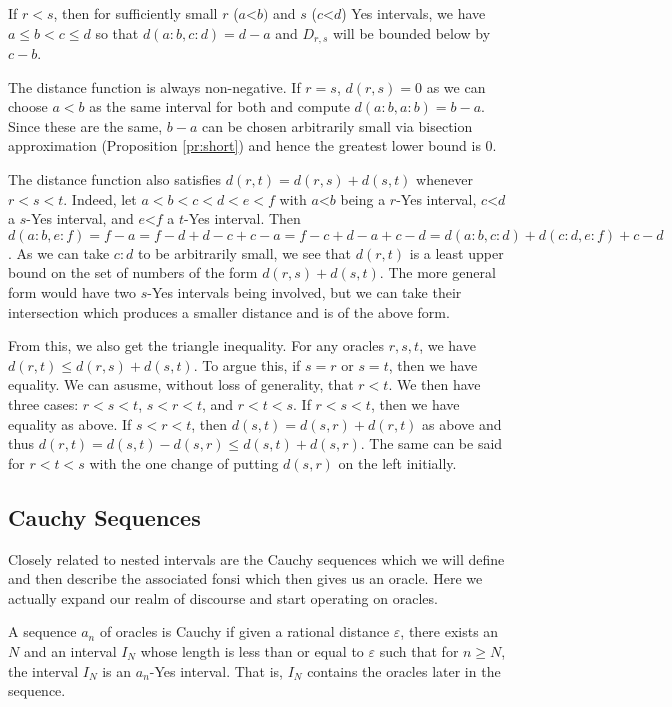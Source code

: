\documentclass[12pt]{article}
\theoremstyle{remark}
\newcommand{\lt}{\mathord{<}}
\begin{document}
If $r<s$, then for sufficiently small $r$ ($a\lt b)$ and $s$ ($c\lt d$) Yes intervals, we have $a\leq b<c \leq d$ so that $d(a:b,c:d) = d-a$ and $D_{r,s}$ will be bounded below by $c-b$.

The distance function is always non-negative. If $r=s$, $d(r,s)=0$ as we can choose $a<b$ as the same interval for both and compute $d(a:b,a:b)= b-a$. Since these are the same, $b-a$ can be chosen arbitrarily small via bisection approximation (Proposition \ref{pr:short}) and hence the greatest lower bound is 0. 

The distance function also satisfies $d(r,t) = d(r,s) + d(s,t)$ whenever $r < s < t$. Indeed, let $a<b<c<d<e<f$ with $a\lt b$ being a $r$-Yes interval, $c\lt d$ a $s$-Yes interval, and $e\lt f$ a $t$-Yes interval. Then $d(a:b, e:f) = f-a = f-d+d-c+c-a = f-c + d -a + c -d =d(a:b,c:d) +d(c:d,e:f) + c-d$. As we can take $c:d$ to be arbitrarily small, we see that $d(r,t)$ is a least upper bound on the set of numbers of the form $d(r,s) + d(s,t)$.  The more general form would have two $s$-Yes intervals being involved, but we can take their intersection which produces a smaller distance and is of the above form. 

From this, we also get the triangle inequality. For any oracles $r, s, t$, we have $d(r,t) \leq d(r,s) + d(s,t)$.  To argue this, if $s = r$ or $s=t$, then we have equality. We can asusme, without loss of generality, that $r < t$. We then have three cases: $r< s< t$, $s < r < t$, and $r< t  < s$. If $r < s< t$, then we have equality as above. If $s < r < t$, then $d(s,t) = d(s,r) + d(r,t)$ as above and thus $d(r,t) = d(s,t) - d(s,r) \leq d(s,t) + d(s,r)$. The same can be said for $r < t < s$ with the one change of putting $d(s,r)$ on the left initially. 

\subsection{Cauchy Sequences}

Closely related to nested intervals are the Cauchy sequences which we will define and then describe the associated fonsi which then gives us an oracle. Here we actually expand our realm of discourse and start operating on oracles. 

A sequence $a_n$ of oracles is Cauchy if given a rational distance $\varepsilon$, there exists an $N$ and an interval $I_N$ whose length is less than or equal to $\varepsilon$ such that for $n \geq N$, the interval $I_N$ is an $a_n$-Yes interval. That is, $I_N$ contains the oracles later in the sequence. 
\end{document}
